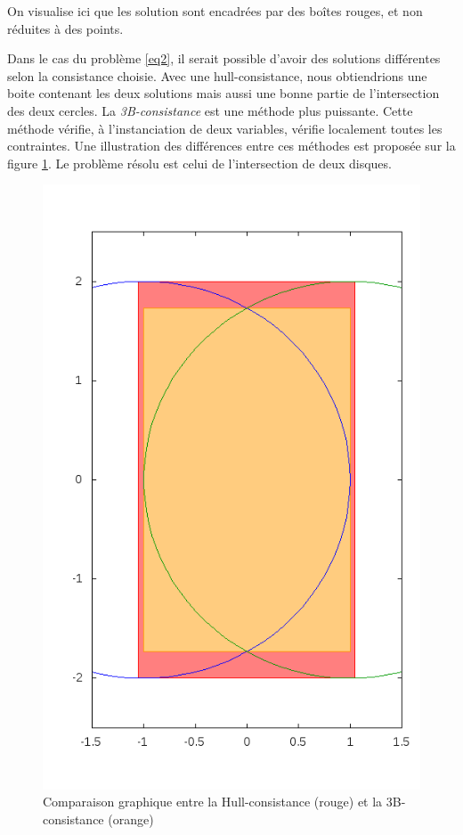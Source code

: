 On visualise ici que les solution sont encadrées par des \og boîtes \fg{} rouges, et non réduites à des points. 

Dans le cas du problème \ref{eq2}, il serait possible d'avoir des solutions différentes selon la consistance choisie. Avec une hull-consistance, nous obtiendrions une boite contenant les deux solutions mais aussi une bonne partie de l'intersection des deux cercles. La \emph{3B-consistance} est une méthode plus puissante. Cette méthode vérifie, à l'instanciation de deux variables, vérifie localement toutes les contraintes. Une illustration des différences entre ces méthodes est proposée sur la figure \ref{fig:3Bconst}. Le problème résolu est celui de l'intersection de deux disques.
\begin{figure}[ht!] %
  \center
\includegraphics[scale=0.35]{img/disk-disk2}
  \caption{Comparaison graphique entre la Hull-consistance (rouge) et la 3B-consistance (orange)} %
 \label{fig:3Bconst} %
\end{figure} %


